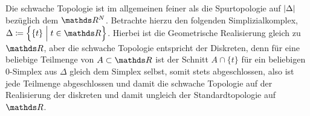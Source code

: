 \begin{Bem}
	Die schwache Topologie ist im allgemeinen feiner als die
	Spurtopologie auf $\left| \Delta \right|$ bezüglich dem $\R^N$. Betrachte
	hierzu den folgenden Simplizialkomplex,
	$\Delta \coloneqq \set{ \{t\} }{t \in \R}$.  Hierbei ist die
	Geometrische Realisierung gleich zu $\R$, aber die schwache
	Topologie entspricht der Diskreten, denn für eine beliebige
	Teilmenge von $A \subset \R$ ist der Schnitt $A \cap \{ t \}$ für
	ein beliebigen $0$-Simplex aus $\Delta$ gleich dem Simplex selbst,
	somit stets abgeschlossen, also ist jede Teilmenge abgeschlossen und
	damit die schwache Topologie auf der Realisierung der diskreten und
	damit ungleich der Standardtopologie auf $\R$.
\end{Bem}



















